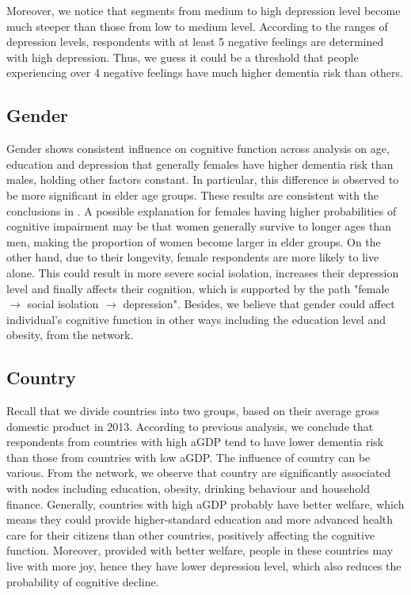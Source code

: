 \documentclass[11pt,twoside]{article}
\numberwithin{Theorem}{section}
\numberwithin{Definition}{section}
\numberwithin{Lemma}{section}
\numberwithin{Algorithm}{section}
\numberwithin{equation}{section}
\begin{document}
Moreover, we notice that segments from medium to high depression level become much steeper than those from low to medium level. According to the ranges of depression levels, respondents with at least 5 negative feelings are determined with high depression. Thus, we guess it could be a threshold that people experiencing over 4 negative feelings have much higher dementia risk than others.

\subsection{Gender}

Gender shows consistent influence on cognitive function across analysis on age, education and depression that generally females have higher dementia risk than males, holding other factors constant. In particular, this difference is observed to be more significant in elder age groups. These results are consistent with the conclusions in \cite{beam2018differences}.  A possible explanation for females having higher probabilities of cognitive impairment may be that women generally survive to longer ages than men, making the proportion of women become larger in elder groups. On the other hand, due to their longevity, female respondents are more likely to live alone. This could result in more severe social isolation, increases their depression level and finally affects their cognition, which is supported by the path "female $\rightarrow$ social isolation $\rightarrow$ depression". Besides, we believe that gender could affect individual's cognitive function in other ways including the education level and obesity, from the network.

\subsection{Country}

Recall that we divide countries into two groups, based on their average gross domestic product in 2013. According to previous analysis, we conclude that respondents from countries with high aGDP tend to have lower dementia risk than those from countries with low aGDP. The influence of country can be various. From the network, we observe that country are significantly associated with nodes including education, obesity, drinking behaviour and household finance. Generally, countries with high aGDP probably have better welfare, which means they could provide higher-standard education and more advanced health care for their citizens than other countries, positively affecting the cognitive function. Moreover, provided with better welfare, people in these countries may live with more joy, hence they have lower depression level, which also reduces the probability of cognitive decline.
\end{document}
